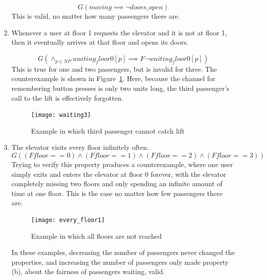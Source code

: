 \documentclass{article}
\begin{document}
\begin{enumerate}
\begin{enumerate}
      \[ G (moving \implies \neg doors\_open )\]
      This is valid, no matter how many passengers there are.

    \item Whenever a user at floor 1 requests the elevator and it is not at
      floor 1, then it eventually arrives at that floor and opens its doors.

      \[ G ( \wedge_{p \in NP} waiting_floor0[p] \implies F \neg waiting_floor0[p] )\]
      This is true for one and two passengers, but is invalid for three.
      The counterexample is shown in Figure~\ref{fig:waiting3}.
      Here, because the channel for remembering button presses is only
      two units long, the third passenger's call to the lift is effectively
      forgotten.
\begin{figure}
  \begin{center}
    \texttt{[image: waiting3]}
  \end{center}
  \caption{Example in which third passenger cannot catch lift}
  \label{fig:waiting3}
\end{figure}

    \item The elevator visits every floor infinitely often.
      \[G \left( (F floor == 0) \wedge (F floor == 1)
      \wedge (F floor == 2) \wedge (F floor == 3) \right) \]
      Trying to verify this property produces a counterexample, where one
      user simply exits and enters the elevator at floor 0
      forever, with the elevator completely missing two floors
      and only spending an infinite amount of time at one floor.
      This is the case no matter how few passengers there are.
\begin{figure}
  \begin{center}
    \texttt{[image: every\_floor1]}
  \end{center}
  \caption{Example in which all floors are not reached}
  \label{fig:everyf}
\end{figure}


  In these examples, decreasing the number of passengers never changed the
  properties, and increasing the number of passengers only made
  property (b), about the fairness of passengers waiting, valid.
  \end{enumerate}
\end{enumerate}

%
%
\end{document}
